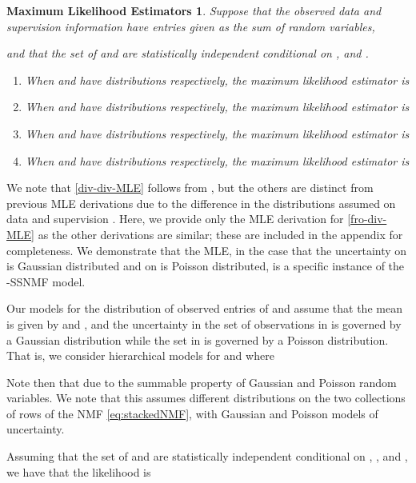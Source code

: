 \documentclass[twocolumn,10pt]{article}
\newtheorem*{mle}{Maximum Likelihood Estimators}
\begin{document}
\begin{mle}
Suppose that the observed data  and supervision information  have entries given as the sum of random variables, 
 
and that the set of  and  are statistically independent conditional on , and .
\begin{enumerate}
\itemsep-0.9em
\item When  and  have distributions 
 respectively, the maximum likelihood estimator is 



\item When  and  have distributions  respectively, the maximum likelihood estimator is
 \label{fro-div-MLE}

\item When  and  have distributions  respectively, the maximum likelihood estimator is 
 \label{div-fro-MLE} 

\item When  and  have distributions  respectively, the maximum likelihood estimator is 
 \label{div-div-MLE}
\end{enumerate}
\end{mle}
\vspace{-0.5cm}

We note that \ref{div-div-MLE} follows from \cite{cemgil2008bayesian,favaro20073,virtanen2008bayesian}, but the others are distinct from previous MLE derivations due to the difference in the 
distributions assumed on data  and supervision .  
Here, we provide only the MLE derivation for \ref{fro-div-MLE} as the other derivations are similar; these are included in the appendix for completeness.
We demonstrate that the MLE, in the case that the uncertainty on  is Gaussian distributed and on  is Poisson distributed, is a specific instance of the -SSNMF
model. 

Our models for the distribution of observed entries of  and  assume that the mean is given by  
 and , and the uncertainty in the set of observations in  is governed by a Gaussian distribution while the set in  is governed by a Poisson distribution.
That is, we consider hierarchical models for  and  where  

Note then that 
{\footnotesize 
}due to the summable property of Gaussian and Poisson random variables.  We note that this assumes different distributions on the two collections of rows of the NMF \eqref{eq:stackedNMF}, with Gaussian and Poisson models of uncertainty. 

Assuming that the set of  and  are statistically independent conditional on , , and , 
we have that the likelihood  is 
\end{document}
